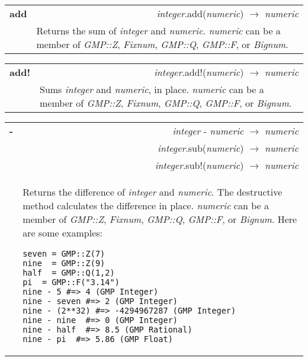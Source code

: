\documentclass[pdftex,10pt]{article}
\newlength{\methwidth}
\newlength{\defnwidth}
\def\qquad{\quad\quad}
\begin{document}
\begin{tabular}{p{\methwidth} l r}
\toprule
\textbf{add} & & \textit{integer}.add(\textit{numeric}) $\rightarrow$ \textit{numeric} \\
\cmidrule(r){2-3}
& \multicolumn{2}{p{\defnwidth}}{
  Returns the sum of \textit{integer} and \textit{numeric}. \textit{numeric} can be a
  member of \textit{GMP::Z}, \textit{Fixnum}, \textit{GMP::Q}, \textit{GMP::F}, or
  \textit{Bignum}.
}
\end{tabular}
\newline\newline

\begin{tabular}{p{\methwidth} l r}
\toprule
\textbf{add!} & & \textit{integer}.add!(\textit{numeric}) $\rightarrow$
\textit{numeric} \\
\cmidrule(r){2-3}
& \multicolumn{2}{p{\defnwidth}}{
  Sums \textit{integer} and \textit{numeric}, in place. \textit{numeric} can be a
  member of \textit{GMP::Z}, \textit{Fixnum}, \textit{GMP::Q}, \textit{GMP::F}, or
  \textit{Bignum}.
}
\end{tabular}
\newline\newline

\begin{tabular}{p{\methwidth} l r}
\toprule
\textbf{-} & & \textit{integer} - \textit{numeric} $\rightarrow$ \textit{numeric} \\
& & \textit{integer}.sub(\textit{numeric}) $\rightarrow$ \textit{numeric} \\
& & \textit{integer}.sub!(\textit{numeric}) $\rightarrow$ \textit{numeric} \\
\cmidrule(r){2-3}
& \multicolumn{2}{p{\defnwidth}}{
  Returns the difference of \textit{integer} and \textit{numeric}. The destructive method
  calculates the difference in place. \textit{numeric} can be a member of
  \textit{GMP::Z}, \textit{Fixnum}, \textit{GMP::Q}, \textit{GMP::F}, or \textit{Bignum}.
  Here are some examples:\newline
  
  \texttt{seven     = GMP::Z(7) \newline
          nine \    = GMP::Z(9) \newline
          half \    = GMP::Q(1,2) \newline
          pi \quad\ = GMP::F("3.14") \newline
          nine - 5 \qquad\quad \#=> 4 (GMP Integer) \newline
          nine - seven \quad \#=> 2 (GMP Integer) \newline
          nine - (2**32) \#=> -4294967287 (GMP Integer) \newline
          nine - nine \quad\ \#=> 0 (GMP Integer) \newline
          nine - half \quad\ \#=> 8.5 (GMP Rational) \newline
          nine - pi \qquad\  \#=> 5.86 (GMP Float)}
  
}
\end{tabular}
\newline\newline
\end{document}
